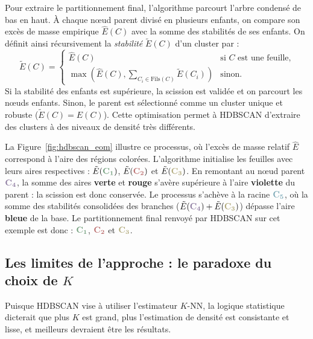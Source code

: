 Pour extraire le partitionnement final, l'algorithme parcourt l'arbre condensé de bas en haut. À chaque nœud parent divisé en plusieurs enfants, on compare son excès de masse empirique $\widehat{E}(C)$ avec la somme des stabilités de ses enfants. On définit ainsi récursivement la \emph{stabilité} $\tilde{E}(C)$ d'un cluster par :
\[
    \tilde{E}(C) = \begin{cases}
        \widehat{E}(C) & \text{si } C \text{ est une feuille,} \\
        \max \left( \widehat{E}(C), \displaystyle\sum_{C_i \in \text{Fils}(C)} \tilde{E}(C_i) \right) & \text{sinon.}
    \end{cases}
\]
Si la stabilité des enfants est supérieure, la scission est validée et on parcourt les n\oe uds enfants. Sinon, le parent est sélectionné comme un cluster unique et robuste ($\tilde{E}(C) = \widehat{E}(C)$). Cette optimisation permet à HDBSCAN d'extraire des clusters à des niveaux de densité très différents.

La Figure~\ref{fig:hdbscan_eom} illustre ce processus, où l'excès de masse relatif $\widehat{E}$ correspond à l'aire des régions colorées. L'algorithme initialise les feuilles avec leurs aires respectives : $\tilde{E}(\textcolor{c1!80!black}{\mathbf{C_1}})$, $\tilde{E}(\textcolor{c2!80!black}{\mathbf{C_2}})$ et $\tilde{E}(\textcolor{c3!80!black}{\mathbf{C_3}})$. En remontant au nœud parent $\textcolor{c4!80!black}{\mathbf{C_4}}$, la somme des aires \textbf{\textcolor{c1!80!black}{verte}} et \textbf{\textcolor{c2!80!black}{rouge}} s'avère supérieure à l'aire \textbf{\textcolor{c4!80!black}{violette}} du parent : la scission est donc conservée. Le processus s'achève à la racine $\textcolor{c5!80!black}{\mathbf{C_5}}$, où la somme des stabilités consolidées des branches ($\tilde{E}(\textcolor{c4!80!black}{\mathbf{C_4}}) + \tilde{E}(\textcolor{c3!80!black}{\mathbf{C_3}})$) dépasse l'aire \textbf{\textcolor{c5!80!black}{bleue}} de la base. Le partitionnement final renvoyé par HDBSCAN sur cet exemple est donc : $\textcolor{c1!80!black}{\mathbf{C_1}}$, $\textcolor{c2!80!black}{\mathbf{C_2}}$ et $\textcolor{c3!80!black}{\mathbf{C_3}}$.



\subsection{Les limites de l'approche : le paradoxe du choix de $K$}

Puisque HDBSCAN vise à utiliser l'estimateur $K$-NN, la logique statistique dicterait que plus $K$ est grand, plus l'estimation de densité est consistante et lisse, et meilleurs devraient être les résultats. 

